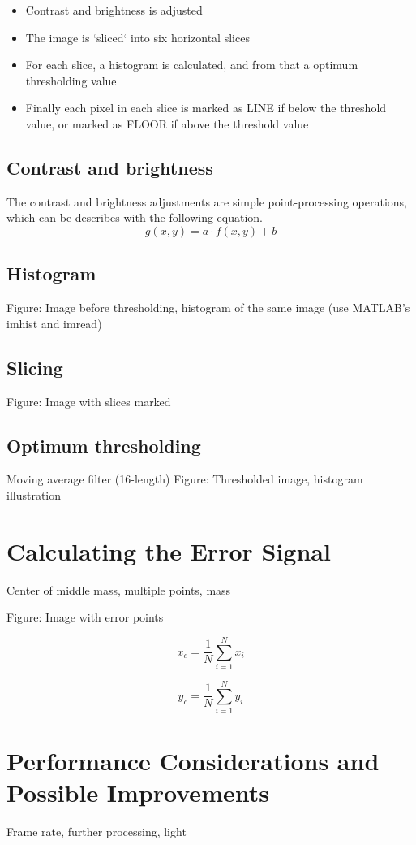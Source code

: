\begin{itemize}
	\item Contrast and brightness is adjusted
	\item The image is `sliced` into six horizontal slices
	\item For each slice, a histogram is calculated, and from that a optimum thresholding value
	\item Finally each pixel in each slice is marked as LINE if below the threshold value, or marked as FLOOR if above the threshold value
\end{itemize}

%
%
%
%
\subsection{Contrast and brightness}

The contrast and brightness adjustments are simple point-processing operations, which can be describes with the following equation.
\begin{equation}
	g(x,y) = a \cdot f(x,y) + b
\end{equation}

%
%
%
%
\subsection{Histogram}

Figure: Image before thresholding, histogram of the same image (use MATLAB's imhist and imread)


%
%
%
%
\subsection{Slicing}

Figure: Image with slices marked

%
%
%
%
\subsection{Optimum thresholding}

Moving average filter (16-length)
Figure: Thresholded image, histogram illustration

%
%
%
%
\section{Calculating the Error Signal}

Center of middle mass, multiple points, mass

Figure: Image with error points

\begin{equation}
	x_c = \frac{1}{N} \sum_{i = 1}^{N}{x_i} 
\end{equation}

\begin{equation}
	y_c = \frac{1}{N} \sum_{i = 1}^{N}{y_i} 
\end{equation}


\section{Performance Considerations and Possible Improvements}
Frame rate, further processing, light

